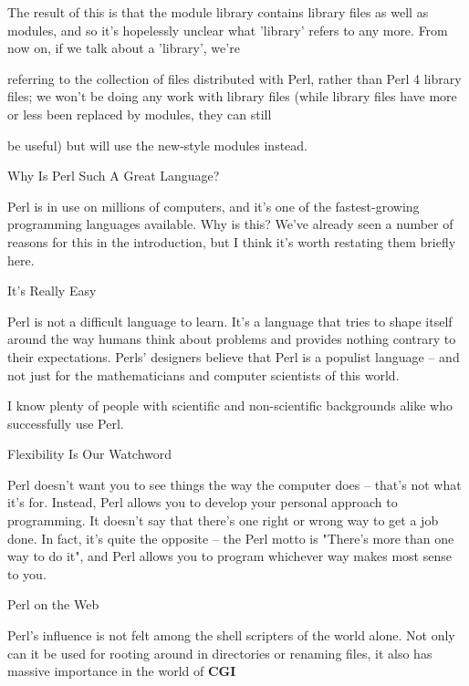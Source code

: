 \documentclass[a4paper,11pt]{book}
\begin{document}
\noindent 

\noindent The result of this is that the module library contains library files as well as modules, and so it's hopelessly unclear what 'library' refers to any more. From now on, if we talk about a 'library', we're

\noindent referring to the collection of files distributed with Perl, rather than Perl 4 library files; we won't be doing any work with library files (while library files have more or less been replaced by modules, they can still

\noindent be useful) but will use the new-style modules instead.

\noindent 

\noindent 

\noindent Why Is Perl Such A Great Language?

\noindent Perl is in use on millions of computers, and it's one of the fastest-growing programming languages available. Why is this? We've already seen a number of reasons for this in the introduction, but I think it's worth restating them briefly here.

\noindent 

\noindent It's Really Easy

\noindent Perl is not a difficult language to learn. It's a language that tries to shape itself around the way humans think about problems and provides nothing contrary to their expectations. Perls' designers believe that Perl is a populist language -- and not just for the mathematicians and computer scientists of this world.

\noindent I know plenty of people with scientific and non-scientific backgrounds alike who successfully use Perl.

\noindent 

\noindent Flexibility Is Our Watchword

\noindent Perl doesn't want you to see things the way the computer does -- that's not what it's for. Instead, Perl allows you to develop your personal approach to programming. It doesn't say that there's one right or wrong way to get a job done. In fact, it's quite the opposite -- the Perl motto is "There's more than one way to do it", and Perl allows you to program whichever way makes most sense to you.

\noindent 

\noindent Perl on the Web

\noindent Perl's influence is not felt among the shell scripters of the world alone. Not only can it be used for rooting around in directories or renaming files, it also has massive importance in the world of \textbf{CGI}
\end{document}
